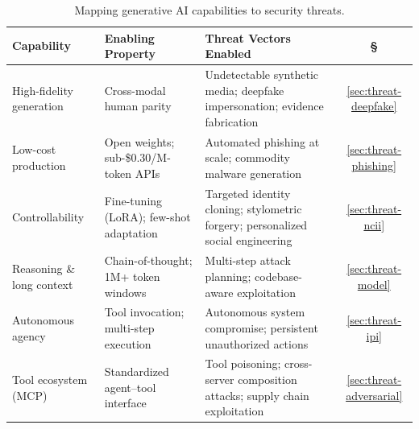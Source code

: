 
\begin{table}[htbp]
\centering
\caption{Mapping generative AI capabilities to security threats.}
\label{tab:cap-threat}
\tiny
\setlength{\tabcolsep}{3pt}
\renewcommand{\arraystretch}{0.88}
\begin{tabularx}{\columnwidth}{l l X c}
\toprule
\textbf{Capability} & \textbf{Enabling Property} & \textbf{Threat Vectors Enabled} & \textbf{\S} \\
\midrule
High-fidelity generation & Cross-modal human parity & Undetectable synthetic media; deepfake impersonation; evidence fabrication & \ref{sec:threat-deepfake} \\
Low-cost production & Open weights; sub-\$0.30/M-token APIs & Automated phishing at scale; commodity malware generation & \ref{sec:threat-phishing} \\
Controllability & Fine-tuning (LoRA); few-shot adaptation & Targeted identity cloning; stylometric forgery; personalized social engineering & \ref{sec:threat-ncii} \\
Reasoning \& long context & Chain-of-thought; 1M+ token windows & Multi-step attack planning; codebase-aware exploitation & \ref{sec:threat-model} \\
Autonomous agency & Tool invocation; multi-step execution & Autonomous system compromise; persistent unauthorized actions & \ref{sec:threat-ipi} \\
Tool ecosystem (MCP) & Standardized agent--tool interface & Tool poisoning; cross-server composition attacks; supply chain exploitation & \ref{sec:threat-adversarial} \\
\bottomrule
\end{tabularx}
\end{table}
